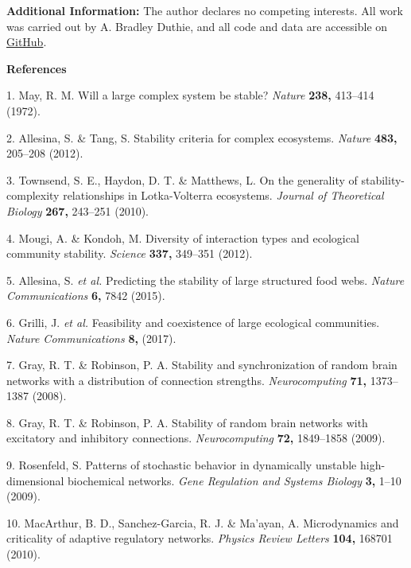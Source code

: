\documentclass[]{article}
\begin{document}
\textbf{Additional Information:} The author declares no competing
interests. All work was carried out by A. Bradley Duthie, and all code
and data are accessible on
\href{https://github.com/bradduthie/RandomMatrixStability}{GitHub}.

\textbf{References}

\hypertarget{refs}{}
\hypertarget{ref-May1972}{}
1. May, R. M. Will a large complex system be stable? \emph{Nature}
\textbf{238,} 413--414 (1972).

\hypertarget{ref-Allesina2012}{}
2. Allesina, S. \& Tang, S. Stability criteria for complex ecosystems.
\emph{Nature} \textbf{483,} 205--208 (2012).

\hypertarget{ref-Townsend2010a}{}
3. Townsend, S. E., Haydon, D. T. \& Matthews, L. On the generality of
stability-complexity relationships in Lotka-Volterra ecosystems.
\emph{Journal of Theoretical Biology} \textbf{267,} 243--251 (2010).

\hypertarget{ref-Mougi2012}{}
4. Mougi, A. \& Kondoh, M. Diversity of interaction types and ecological
community stability. \emph{Science} \textbf{337,} 349--351 (2012).

\hypertarget{ref-Allesina2015}{}
5. Allesina, S. \emph{et al.} Predicting the stability of large
structured food webs. \emph{Nature Communications} \textbf{6,} 7842
(2015).

\hypertarget{ref-Grilli2017}{}
6. Grilli, J. \emph{et al.} Feasibility and coexistence of large
ecological communities. \emph{Nature Communications} \textbf{8,} (2017).

\hypertarget{ref-Gray2008}{}
7. Gray, R. T. \& Robinson, P. A. Stability and synchronization of
random brain networks with a distribution of connection strengths.
\emph{Neurocomputing} \textbf{71,} 1373--1387 (2008).

\hypertarget{ref-Gray2009}{}
8. Gray, R. T. \& Robinson, P. A. Stability of random brain networks
with excitatory and inhibitory connections. \emph{Neurocomputing}
\textbf{72,} 1849--1858 (2009).

\hypertarget{ref-Rosenfeld2009}{}
9. Rosenfeld, S. Patterns of stochastic behavior in dynamically unstable
high-dimensional biochemical networks. \emph{Gene Regulation and Systems
Biology} \textbf{3,} 1--10 (2009).

\hypertarget{ref-MacArthur2010}{}
10. MacArthur, B. D., Sanchez-Garcia, R. J. \& Ma'ayan, A. Microdynamics
and criticality of adaptive regulatory networks. \emph{Physics Review
Letters} \textbf{104,} 168701 (2010).
\end{document}

